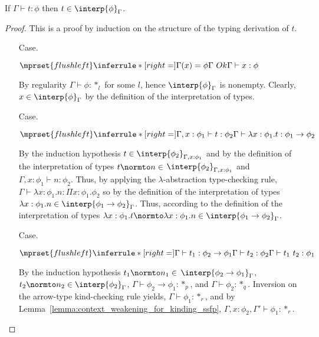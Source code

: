 \begin{thm}
  If $\Gamma \vdash t:\phi$ then $t \in \interp{\phi}_\Gamma$.
  \label{thm:soundness_ssfp}
\end{thm}
\begin{proof}
  This is a proof by induction on the structure of the typing derivation of $t$.

\begin{itemize}
\item[Case.]\ \\
  \begin{center}
    \begin{math}
      $$\mprset{flushleft}
      \inferrule* [right=] {
        \Gamma(x) = \phi
        \\
        \Gamma\ Ok
      }{\Gamma \vdash x:\phi}
    \end{math}
  \end{center}
  By regularity $\Gamma \vdash \phi:*_l$ for some $l$, hence $\interp{\phi}_\Gamma$ is nonempty.
  Clearly, $x \in \interp{\phi}_\Gamma$ by the definition of the interpretation of types.
  
\item[Case.]\ \\
  \begin{center}
    \begin{math}
      $$\mprset{flushleft}
      \inferrule* [right=] {
        \Gamma,x:\phi_1 \vdash t:\phi_2
      }{\Gamma \vdash \lambda x:\phi_1.t : \phi_1 \rightarrow \phi_2}
    \end{math}
  \end{center}
  By the induction hypothesis $t \in
  \interp{\phi_2}_{\Gamma,x:\phi_1}$ and by the definition of the
  interpretation of types $t \normto n \in $ 
  $\interp{\phi_2}_{\Gamma,x:\phi_1}$ and $\Gamma, x:\phi_1 \vdash
  n:\phi_2$.  Thus, by applying the $\lambda$-abstraction type-checking
  rule, $\Gamma \vdash \lambda x:\phi_1.n:\Pi x:\phi_1.\phi_2$ so 
  by the definition of the interpretation of types $\lambda x:\phi_1.n
  \in \interp{\phi_1 \rightarrow \phi_2}_\Gamma$.  Thus, according to the
  definition of the interpretation of types $\lambda x:\phi_1.t
  \normto \lambda x:\phi_1.n \in \interp{\phi_1 \rightarrow \phi_2}_\Gamma$.

\item[Case.]\ \\
  \begin{center}
    \begin{math}
      $$\mprset{flushleft}
      \inferrule* [right=] {
        \Gamma \vdash t_1 : \phi_2 \rightarrow \phi_1 
        \\
        \Gamma \vdash t_2 : \phi_2
      }{\Gamma \vdash t_1\ t_2 : \phi_1}
    \end{math}
  \end{center}
  By the induction hypothesis $t_1 \normto n_1 \in $
  $\interp{\phi_2 \rightarrow \phi_1}_\Gamma$,
  $t_2 \normto n_2 \in \interp{\phi_2}_\Gamma$, $\Gamma \vdash \phi_2 \rightarrow \phi_1:*_p$, 
  and $\Gamma \vdash \phi_2:*_q$.  Inversion on the arrow-type kind-checking rule yields, 
  $\Gamma \vdash \phi_1:*_r$, and by
  Lemma~\ref{lemma:context_weakening_for_kinding_ssfp}, 
  $\Gamma,x:\phi_2,\Gamma' \vdash \phi_1:*_r$.


\end{itemize}
\end{proof}
